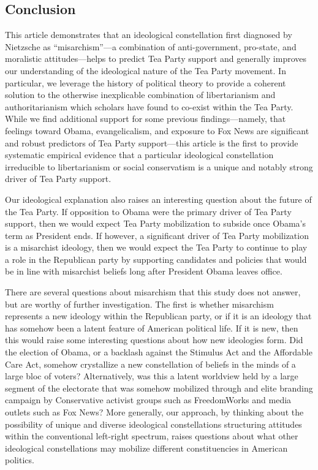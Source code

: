 \documentclass[12pt,]{article}
\begin{document}
\subsection{Conclusion}\label{conclusion}

This article demonstrates that an ideological constellation first
diagnosed by Nietzsche as ``misarchism''---a combination of
anti-government, pro-state, and moralistic attitudes---helps to predict
Tea Party support and generally improves our understanding of the
ideological nature of the Tea Party movement. In particular, we leverage
the history of political theory to provide a coherent solution to the
otherwise inexplicable combination of libertarianism and
authoritarianism which scholars have found to co-exist within the Tea
Party. While we find additional support for some previous
findings---namely, that feelings toward Obama, evangelicalism, and
exposure to Fox News are significant and robust predictors of Tea Party
support---this article is the first to provide systematic empirical
evidence that a particular ideological constellation irreducible to
libertarianism or social conservatism is a unique and notably strong
driver of Tea Party support.

Our ideological explanation also raises an interesting question about
the future of the Tea Party. If opposition to Obama were the primary
driver of Tea Party support, then we would expect Tea Party mobilization
to subside once Obama's term as President ends. If however, a
significant driver of Tea Party mobilization is a misarchist ideology,
then we would expect the Tea Party to continue to play a role in the
Republican party by supporting candidates and policies that would be in
line with misarchist beliefs long after President Obama leaves office.

There are several questions about misarchism that this study does not
answer, but are worthy of further investigation. The first is whether
misarchism represents a new ideology within the Republican party, or if
it is an ideology that has somehow been a latent feature of American
political life. If it is new, then this would raise some interesting
questions about how new ideologies form. Did the election of Obama, or a
backlash against the Stimulus Act and the Affordable Care Act, somehow
crystallize a new constellation of beliefs in the minds of a large bloc
of voters? Alternatively, was this a latent worldview held by a large
segment of the electorate that was somehow mobilized through and elite
branding campaign by Conservative activist groups such as FreedomWorks
and media outlets such as Fox News? More generally, our approach, by
thinking about the possibility of unique and diverse ideological
constellations structuring attitudes within the conventional left-right
spectrum, raises questions about what other ideological constellations
may mobilize different constituencies in American politics.
\end{document}
